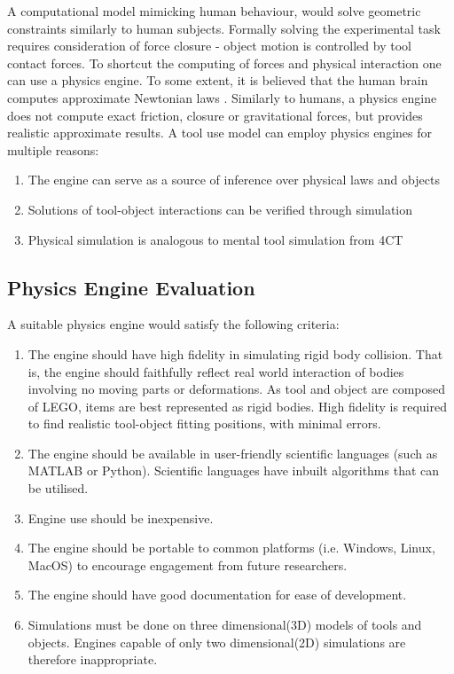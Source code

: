 \documentclass[11]{article}
\begin{document}
A computational model mimicking human behaviour, would solve geometric constraints similarly to human subjects.
Formally solving the experimental task requires consideration of force closure - object motion is controlled by tool contact forces.
To shortcut the computing of forces and physical interaction one can use a physics engine. 
To some extent, it is believed that the human brain computes approximate Newtonian laws \cite{battaglia2013}. 
Similarly to humans, a physics engine does not compute exact friction, closure or gravitational forces, but provides realistic approximate results. 
A tool use model can employ physics engines for  multiple reasons:
\begin{enumerate}
\itemsep0em 
\item The engine can serve as a source of inference over physical laws and objects 
\item Solutions of tool-object interactions can be verified through simulation
\item Physical simulation is analogous to mental tool simulation from 4CT
\end{enumerate}

\subsection{Physics Engine Evaluation}

A suitable physics engine would satisfy the following criteria:
\begin{enumerate}
\item The engine should have high fidelity in simulating rigid body collision. 
That is, the engine should faithfully reflect real world interaction of bodies involving no moving parts or deformations.
As tool and object are composed of LEGO, items are best represented as rigid bodies.   
High fidelity is required to find realistic tool-object fitting positions, with minimal errors.
\item The engine should be available in user-friendly scientific languages (such as MATLAB or Python). 
Scientific languages have inbuilt algorithms that can be utilised.
\item Engine use should be inexpensive.
\item The engine should be portable to common platforms (i.e. Windows, Linux, MacOS) to encourage engagement from future researchers.
\item The engine should have good documentation for ease of development.
\item Simulations must be done on three dimensional(3D) models of tools and objects.
Engines capable of only two dimensional(2D) simulations are therefore inappropriate.  
\end{enumerate}
\end{document}
